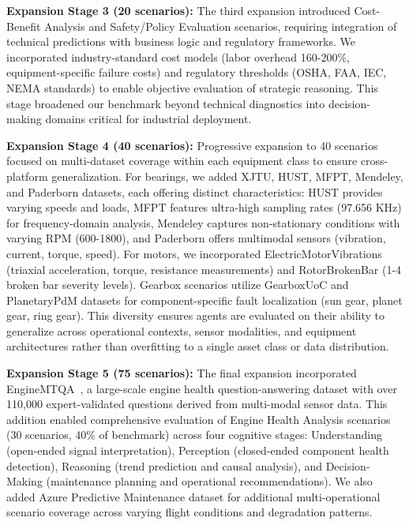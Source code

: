 \documentclass[sigconf]{acmart}
\begin{document}
\textbf{Expansion Stage 3 (20 scenarios):} The third expansion introduced Cost-Benefit Analysis and Safety/Policy Evaluation scenarios, requiring integration of technical predictions with business logic and regulatory frameworks. We incorporated industry-standard cost models (labor overhead 160-200\%, equipment-specific failure costs) and regulatory thresholds (OSHA, FAA, IEC, NEMA standards) to enable objective evaluation of strategic reasoning. This stage broadened our benchmark beyond technical diagnostics into decision-making domains critical for industrial deployment.

\textbf{Expansion Stage 4 (40 scenarios):} Progressive expansion to 40 scenarios focused on multi-dataset coverage within each equipment class to ensure cross-platform generalization. For bearings, we added XJTU, HUST, MFPT, Mendeley, and Paderborn datasets, each offering distinct characteristics: HUST provides varying speeds and loads, MFPT features ultra-high sampling rates (97.656 KHz) for frequency-domain analysis, Mendeley captures non-stationary conditions with varying RPM (600-1800), and Paderborn offers multimodal sensors (vibration, current, torque, speed). For motors, we incorporated ElectricMotorVibrations (triaxial acceleration, torque, resistance measurements) and RotorBrokenBar (1-4 broken bar severity levels). Gearbox scenarios utilize GearboxUoC and PlanetaryPdM datasets for component-specific fault localization (sun gear, planet gear, ring gear). This diversity ensures agents are evaluated on their ability to generalize across operational contexts, sensor modalities, and equipment architectures rather than overfitting to a single asset class or data distribution.

\textbf{Expansion Stage 5 (75 scenarios):} The final expansion incorporated EngineMTQA~\cite{lei2024itformer}, a large-scale engine health question-answering dataset with over 110,000 expert-validated questions derived from multi-modal sensor data. This addition enabled comprehensive evaluation of Engine Health Analysis scenarios (30 scenarios, 40\% of benchmark) across four cognitive stages: Understanding (open-ended signal interpretation), Perception (closed-ended component health detection), Reasoning (trend prediction and causal analysis), and Decision-Making (maintenance planning and operational recommendations). We also added Azure Predictive Maintenance dataset for additional multi-operational scenario coverage across varying flight conditions and degradation patterns.
\end{document}
